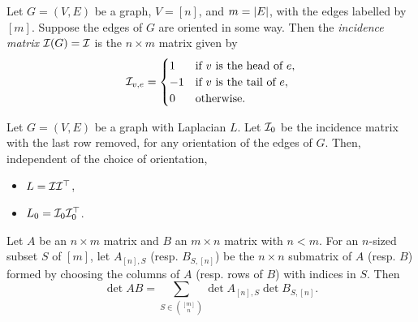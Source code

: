 \begin{definition}
    Let $G = (V, E)$  be a graph, $V = [n]$, and $m = \abs{E}$, with the
    edges labelled by $[m]$.
    Suppose the edges of $G$ are oriented in some way.
    Then the \emph{incidence matrix} $\mathcal{I}(G) = \mathcal{I}$ is the $n \times m$
    matrix given by \[
        \mathcal{I}_{v,e} = \begin{cases}
            1 & \text{if } v \text{ is the head of } e, \\
            -1 & \text{if } v \text{ is the tail of } e, \\
            0 & \text{otherwise}.
        \end{cases}
    \]
\end{definition}
\begin{exercise*}
    Let $G = (V, E)$ be a graph with Laplacian $L$.
    Let $\mathcal{I}_0$ be the incidence matrix with the last row removed, for any
    orientation of the edges of $G$.
    Then, independent of the choice of orientation,
    \begin{itemize}
        \item $L = \mathcal{I} \mathcal{I}^\top$,
        \item $L_0 = \mathcal{I}_0 \mathcal{I}_0^\top$.
    \end{itemize}
\end{exercise*}

\begin{theorem*} \label{thm:cauchy-binet}
    Let $A$ be an $n \times m$ matrix and $B$ an $m \times n$ matrix with
    $n < m$.
    For an $n$-sized subset $S$ of $[m]$,
    let $A_{[n], S}$ (resp. $B_{S, [n]}$) be the
    $n \times n$ submatrix of $A$ (resp. $B$)
    formed by choosing the columns of $A$ (resp. rows of $B$)
    with indices in $S$.
    Then \[
        \det AB = \sum_{S \in \binom{[m]}{n}} \det A_{[n],S} \det B_{S,[n]}.
    \]
\end{theorem*}

